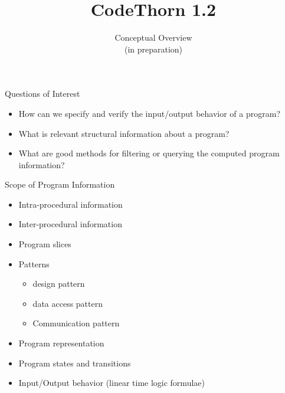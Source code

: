 




\title{CodeThorn 1.2}
\subtitle{Conceptual Overview\\(in preparation)}


\maketitle


\begin{frame}{Questions of Interest}
\begin{itemize}
\item How can we specify and verify the input/output behavior of a program?
\item What is relevant structural information about a program?
\item What are good methods for filtering or querying the computed program information?
\end{itemize}
\end{frame}

\begin{frame}{Scope of Program Information}
\begin{itemize}
\item Intra-procedural information
\item Inter-procedural information
\item Program slices
\item Patterns
\begin{itemize}
\item design pattern
\item data access pattern
\item Communication pattern
\end{itemize}
\item Program representation
\item Program states and transitions
\item Input/Output behavior (linear time logic formulae)
\end{itemize}

\end{frame}

